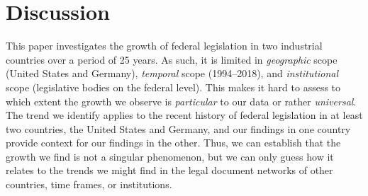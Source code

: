 \section{Discussion}
\label{section:discussion}

This paper investigates the growth of federal legislation in two industrial countries over a period of 25 years. 
As such, it is limited in \emph{geographic} scope (United States and Germany), 
\emph{temporal} scope (1994--2018), and \emph{institutional} scope (legislative bodies on the federal level). 
This makes it hard to assess to which extent the growth we observe is \emph{particular} to our data or rather \emph{universal}. 
The trend we identify applies to the recent history of federal legislation in at least two countries, the United States and Germany, 
and our findings in one country provide context for our findings in the other. 
Thus, we can establish that the growth we find is not a singular phenomenon, but we can only guess how it relates to the trends we might find in the legal document networks of other countries, time frames, or institutions.

